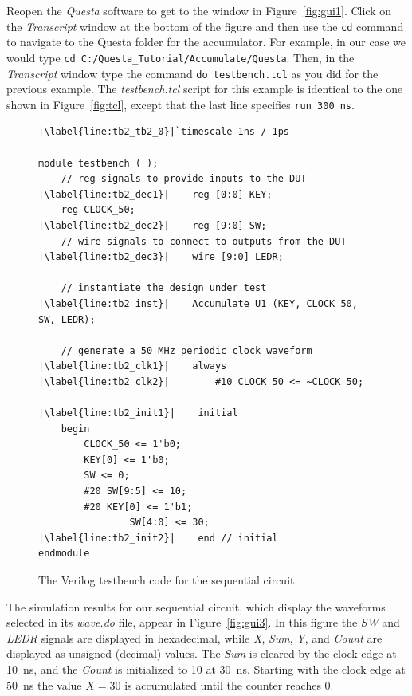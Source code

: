 \documentclass[11pt, twoside, pdftex]{article}
\begin{document}
\noindent
Reopen the {\it Questa} software to get to the window in Figure~\ref{fig:gui1}.
Click on the {\it Transcript} window at the bottom of the figure and then use the
\texttt{cd} command to navigate to the Questa folder for the accumulator. For 
example, in our case we would type 
\texttt{cd C:/Questa\_Tutorial/Accumulate/Questa}. 
Then, in the {\it Transcript} window type the command \texttt{do testbench.tcl} as you
did for the previous example. The {\it testbench.tcl} script for this example is identical
to the one shown in Figure~\ref{fig:tcl}, except that the last line specifies
\texttt{run 300 ns}.

\lstset{language=Verilog,numbers=left,escapechar=|}
\begin{figure}[h]
\begin{center}
\begin{minipage}[t]{12.5 cm}
\begin{lstlisting}[name=testbench2]
|\label{line:tb2_tb2_0}|`timescale 1ns / 1ps

module testbench ( );
    // reg signals to provide inputs to the DUT
|\label{line:tb2_dec1}|    reg [0:0] KEY;
    reg CLOCK_50;
|\label{line:tb2_dec2}|    reg [9:0] SW;
    // wire signals to connect to outputs from the DUT
|\label{line:tb2_dec3}|    wire [9:0] LEDR;

    // instantiate the design under test
|\label{line:tb2_inst}|    Accumulate U1 (KEY, CLOCK_50, SW, LEDR);

    // generate a 50 MHz periodic clock waveform
|\label{line:tb2_clk1}|    always
|\label{line:tb2_clk2}|        #10 CLOCK_50 <= ~CLOCK_50;

|\label{line:tb2_init1}|    initial
    begin
        CLOCK_50 <= 1'b0;
        KEY[0] <= 1'b0;
        SW <= 0;
        #20 SW[9:5] <= 10;
        #20	KEY[0] <= 1'b1;
        		SW[4:0] <= 30;
|\label{line:tb2_init2}|    end // initial
endmodule
\end{lstlisting}
\end{minipage}
\caption{The Verilog testbench code for the sequential circuit.}
\label{fig:tb2}
\end{center}
\end{figure}

\noindent
The simulation results for our sequential circuit, which display the waveforms selected in its
{\it wave.do} file, appear in Figure~\ref{fig:gui3}. In this figure the {\it SW} and 
{\it LEDR} signals are displayed in hexadecimal, while {\it X}, {\it Sum}, {\it Y}, and {\it
Count} are displayed as unsigned (decimal) values. The {\it Sum} is cleared by the 
clock edge at 10~ns, and the {\it Count} is initialized to 10 at 30~ns. Starting with the clock
edge at 50~ns the value $X=30$ is accumulated until the counter reaches 0.
\end{document}
